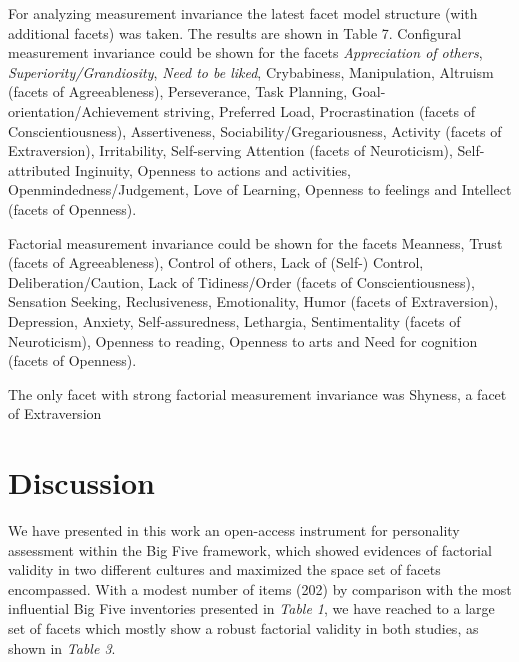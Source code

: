 \documentclass[,man,floatsintext]{apa6}
\begin{document}
For analyzing measurement invariance the latest facet model structure
(with additional facets) was taken. The results are shown in Table 7.
Configural measurement invariance could be shown for the facets
\emph{Appreciation of others}, \emph{Superiority/Grandiosity},
\emph{Need to be liked}, Crybabiness, Manipulation, Altruism (facets of
Agreeableness), Perseverance, Task Planning,
Goal-orientation/Achievement striving, Preferred Load, Procrastination
(facets of Conscientiousness), Assertiveness,
Sociability/Gregariousness, Activity (facets of Extraversion),
Irritability, Self-serving Attention (facets of Neuroticism),
Self-attributed Inginuity, Openness to actions and activities,
Openmindedness/Judgement, Love of Learning, Openness to feelings and
Intellect (facets of Openness).

Factorial measurement invariance could be shown for the facets Meanness,
Trust (facets of Agreeableness), Control of others, Lack of (Self-)
Control, Deliberation/Caution, Lack of Tidiness/Order (facets of
Conscientiousness), Sensation Seeking, Reclusiveness, Emotionality,
Humor (facets of Extraversion), Depression, Anxiety, Self-assuredness,
Lethargia, Sentimentality (facets of Neuroticism), Openness to reading,
Openness to arts and Need for cognition (facets of Openness).

The only facet with strong factorial measurement invariance was Shyness,
a facet of Extraversion

\vspace{5mm}

\vspace{5mm}

\section{Discussion}\label{discussion}

We have presented in this work an open-access instrument for personality
assessment within the Big Five framework, which showed evidences of
factorial validity in two different cultures and maximized the space set
of facets encompassed. With a modest number of items (202) by comparison
with the most influential Big Five inventories presented in \emph{Table
1}, we have reached to a large set of facets which mostly show a robust
factorial validity in both studies, as shown in \emph{Table 3}.
\end{document}
